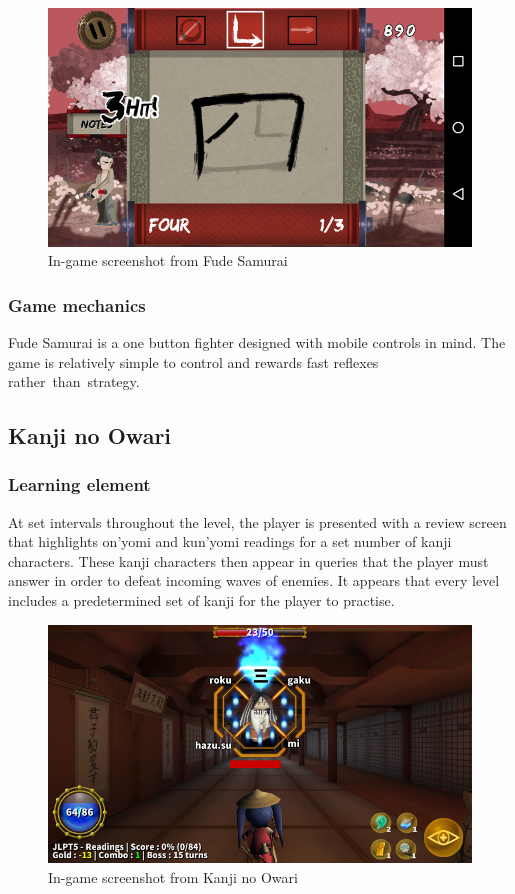 \documentclass[thesis=B,english,hidelinks]{FITthesisXE}[2012/06/26]
\begin{document}
\begin{figure}[ht]
\centering
\includegraphics[scale=0.45]{fude1}
\caption{In-game screenshot from Fude Samurai}
\label{fig:fude}
\end{figure}

\subsubsection{Game mechanics}

Fude Samurai is a one button fighter designed with mobile controls in mind. The game is relatively simple to control and rewards fast reflexes rather~than~strategy.

\subsection{Kanji no Owari}

\subsubsection{Learning element}

At set intervals throughout the level, the player is presented with a review screen that highlights on'yomi and kun'yomi readings for a set number of kanji characters. These kanji characters then appear in queries that the player must answer in order to defeat incoming waves of enemies. It appears that every level includes a predetermined set of kanji for the player to practise.

\begin{figure}[ht]
\centering
\includegraphics[scale=0.45]{owaru1}
\caption{In-game screenshot from Kanji no Owari}
\label{fig:owaru}
\end{figure}
\end{document}
